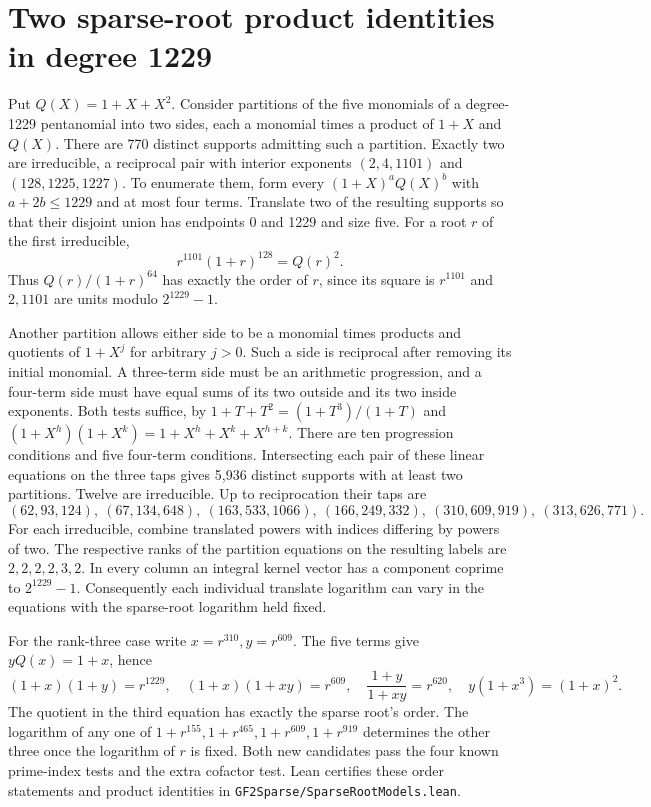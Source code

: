 \documentclass[11pt]{article}
\begin{document}
\section{Two sparse-root product identities in degree 1229}
\label{sec:translate-products}
Put \(Q(X)=1+X+X^2\). Consider partitions of the five monomials of a
degree-1229 pentanomial into two sides, each a monomial times a product
of \(1+X\) and \(Q(X)\). There are 770 distinct supports admitting
such a partition. Exactly two are irreducible, a reciprocal pair with
interior exponents \((2,4,1101)\) and \((128,1225,1227)\).
To enumerate them, form every \((1+X)^a Q(X)^b\) with \(a+2b\le1229\)
and at most four terms. Translate two of the resulting supports so that
their disjoint union has endpoints 0 and 1229 and size five.
For a root \(r\) of the first irreducible,
\[
                 r^{1101}(1+r)^{128}=Q(r)^2.
\]
Thus \(Q(r)/(1+r)^{64}\) has exactly the order of \(r\), since its
square is \(r^{1101}\) and \(2,1101\) are units modulo \(2^{1229}-1\).

Another partition allows either side to be a monomial times products
and quotients of \(1+X^j\) for arbitrary \(j>0\). Such a side is
reciprocal after removing its initial monomial. A three-term side
must be an arithmetic progression, and a four-term side must have
equal sums of its two outside and its two inside exponents. Both tests
suffice, by \(1+T+T^2=(1+T^3)/(1+T)\) and
\((1+X^h)(1+X^k)=1+X^h+X^k+X^{h+k}\).
There are ten progression conditions and five four-term conditions.
Intersecting each pair of these linear equations on the three taps
gives 5,936 distinct supports with at least two partitions. Twelve are
irreducible. Up to reciprocation their taps are
\[
 (62,93,124),\ (67,134,648),\ (163,533,1066),\
 (166,249,332),\ (310,609,919),\ (313,626,771).
\]
For each irreducible, combine translated powers with indices differing
by powers of two. The respective ranks of the partition equations on
the resulting labels are \(2,2,2,2,3,2\). In every column an integral
kernel vector has a component coprime to \(2^{1229}-1\).
Consequently each individual translate logarithm can vary in the
equations with the sparse-root logarithm held fixed.

For the rank-three case write \(x=r^{310},y=r^{609}\).
The five terms give \(yQ(x)=1+x\), hence
\[
 (1+x)(1+y)=r^{1229},\quad (1+x)(1+xy)=r^{609},\quad
 \frac{1+y}{1+xy}=r^{620},\quad y(1+x^3)=(1+x)^2.
\]
The quotient in the third equation has exactly the sparse root's order.
The logarithm of any one of \(1+r^{155},1+r^{465},1+r^{609},1+r^{919}\)
determines the other three once the logarithm of \(r\) is fixed.
Both new candidates pass the four known prime-index tests and the extra
cofactor test. Lean certifies these order statements and product
identities in \nolinkurl{GF2Sparse/SparseRootModels.lean}.
\end{document}
